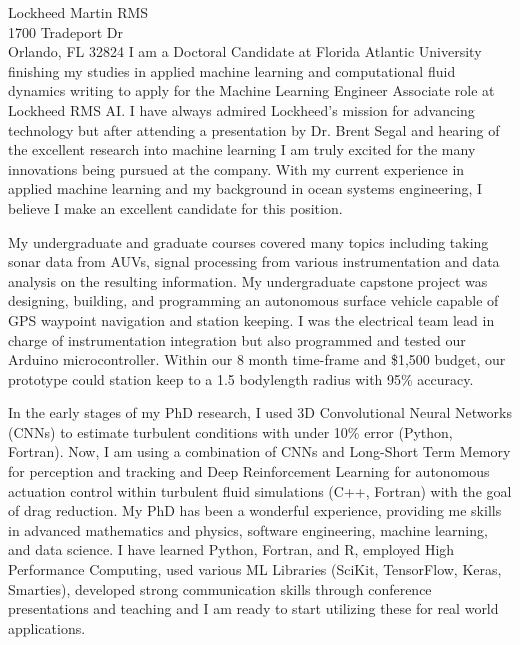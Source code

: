 \documentclass[11pt]{letter} %
\begin{document}
\begin{letter}{Lockheed Martin RMS\\
1700 Tradeport Dr \\
Orlando, FL 32824
}
I am a Doctoral Candidate at Florida Atlantic University finishing my studies in applied machine learning and computational fluid dynamics writing to apply for the Machine Learning Engineer Associate role at Lockheed RMS AI. I have always admired Lockheed's mission for advancing technology but after attending a presentation by Dr. Brent Segal and hearing of the excellent research into machine learning I am truly excited for the many innovations being pursued at the company. With my current experience in applied machine learning and my background in ocean systems engineering, I believe I make an excellent candidate for this position.
 

My undergraduate and graduate courses covered many topics including taking sonar data from AUVs, signal processing from various instrumentation and data analysis on the resulting information. My undergraduate capstone project was designing, building, and programming an autonomous surface vehicle capable of GPS waypoint navigation and station keeping. I was the electrical team lead in charge of instrumentation integration but also programmed and tested our Arduino microcontroller. Within our 8 month time-frame and \$1,500 budget, our prototype could station keep to a 1.5 bodylength radius with 95\% accuracy. 

In the early stages of my PhD research, I used 3D Convolutional Neural Networks (CNNs) to estimate turbulent conditions with under 10\% error (Python, Fortran). Now, I am using a combination of CNNs and Long-Short Term Memory for perception and tracking and Deep Reinforcement Learning for autonomous actuation control within turbulent fluid simulations (C++, Fortran) with the goal of drag reduction. My PhD has been a wonderful experience, providing me skills in advanced mathematics and physics, software engineering, machine learning, and data science. I have learned Python, Fortran, and R, employed High Performance Computing, used various ML Libraries (SciKit, TensorFlow, Keras, Smarties), developed strong communication skills through conference presentations and teaching and I am ready to start utilizing these for real world applications. 
 

\end{letter}
\end{document}
